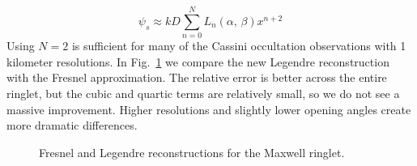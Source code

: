 \documentclass{article}
\theoremstyle{plain}
\begin{document}
        \begin{equation}
            \psi_{s}\approx{k}D\sum_{n=0}^{N}L_{n}(\alpha,\,\beta)x^{n+2}
        \end{equation}
        Using $N=2$ is sufficient for many of the Cassini occultation
        observations with 1 kilometer resolutions. In
        Fig.~\ref{fig:maxwell_ringlet_newton_vs_fresnel_vs_legendre} we compare
        the new Legendre reconstruction with the Fresnel approximation. The
        relative error is better across the entire ringlet, but the
        cubic and quartic terms are relatively small, so we do not see a
        massive improvement. Higher resolutions and slightly lower opening
        angles create more dramatic differences.
        \begin{figure}
            \centering
            \label{fig:maxwell_ringlet_newton_vs_fresnel_vs_legendre}
            \caption{%
                Fresnel and Legendre reconstructions for the Maxwell ringlet.%
            }
        \end{figure}
\end{document}
